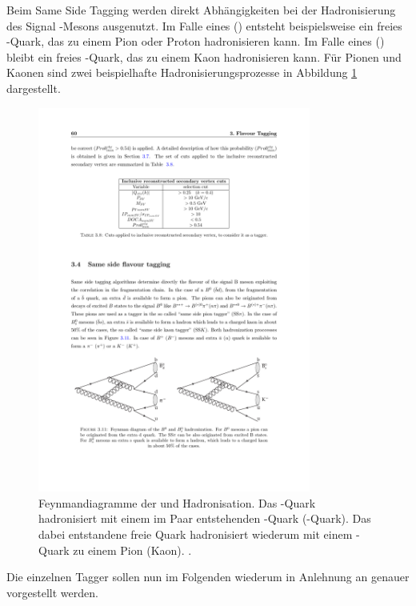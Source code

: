 Beim Same Side Tagging werden direkt Abhängigkeiten bei der Hadronisierung des Signal \B-Mesons ausgenutzt. Im Falle eines \Bz (\bquarkbar\dquark) entsteht beispielsweise ein freies \dquarkbar-Quark, das zu einem Pion oder Proton hadronisieren kann. Im Falle eines \Bs (\bquarkbar\squark) bleibt ein freies \squarkbar-Quark, das zu einem Kaon hadronisieren kann. Für Pionen und Kaonen sind zwei beispielhafte Hadronisierungsprozesse in Abbildung \ref{fig:FThadronisierung} dargestellt.
\begin{figure}[htpb]
	\centering
		\includegraphics[width=0.8\textwidth]{fig/FThadronisierung.pdf}
	\caption{Feynmandiagramme der \Bz und \Bs Hadronisation. Das \bquark-Quark hadronisiert mit einem im Paar entstehenden \dquarkbar-Quark (\squarkbar-Quark). Das dabei entstandene freie Quark hadronisiert wiederum mit einem \uquarkbar-Quark zu einem Pion (Kaon). \cite{tagging}.}
	\label{fig:FThadronisierung} 
\end{figure} 
Die einzelnen Tagger sollen nun im Folgenden wiederum in Anlehnung an \cite{tagging} genauer vorgestellt werden.
